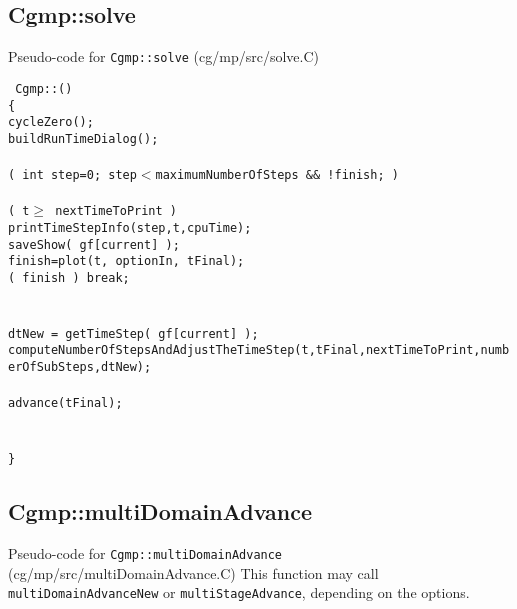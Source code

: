 \subsection{Cgmp::solve}
Pseudo-code for {\tt Cgmp::solve} (cg/mp/src/solve.C)

\begin{flushleft}\tt\small
Cgmp::() \\
\{  \\
\ia  cycleZero();  \\
\ia  buildRunTimeDialog(); \\
\ia \\
\ia  \FOR( int step=0; step$<$maximumNumberOfSteps \&\& !finish;  ) \\
\ib \\
\ib    \IF( t$\ge$ nextTimeToPrint ) \\
\ic      printTimeStepInfo(step,t,cpuTime); \\
\ic      saveShow( gf[current] );  \\
\ic      finish=plot(t, optionIn, tFinal);   \\
\ic      \IF( finish ) break; \\
\ib    \END \\
\ib \\
\ib    dtNew = getTimeStep( gf[current] );   \\
\ib    computeNumberOfStepsAndAdjustTheTimeStep(t,tFinal,nextTimeToPrint,numberOfSubSteps,dtNew); \\
\ib \\
\ib    advance(tFinal);   \\
\ib  \\
\ia  \END \\
\}
\end{flushleft}


\clearpage
\subsection{Cgmp::multiDomainAdvance}\label{sec:Cgmp::multiDomainAdvance}

Pseudo-code for {\tt Cgmp::multiDomainAdvance} (cg/mp/src/multiDomainAdvance.C)
This function may call {\tt multiDomainAdvanceNew} or {\tt multiStageAdvance}, depending
on the options. 

